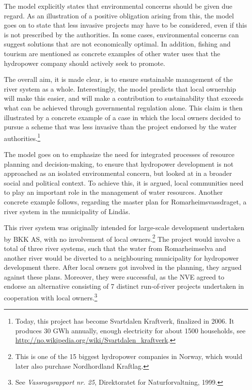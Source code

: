 The model explicitly states that environmental concerns should be given due regard. As an illustration of a positive obligation arising from this, the model goes on to state that less invasive projects may have to be considered, even if this is not prescribed by the authorities. In some cases, environmental concerns can suggest solutions that are not economically optimal. In addition, fishing and tourism are mentioned as concrete examples of other water uses that the hydropower company should actively seek to promote.

The overall aim, it is made clear, is to ensure sustainable management of the river system as a whole. Interestingly, the model predicts that local ownership will make this easier, and will make a contribution to sustainability that exceeds what can be achieved through governmental regulation alone. This claim is then illustrated by a concrete example of a case in which the local owners decided to pursue a scheme that was less invasive than the project endorsed by the water authorities.\footnote{Today, this project has become Svartdalen Kraftverk, finalized in 2006. It produces 30 GWh annually, enough electricity for about 1500 households, see \url{http://no.wikipedia.org/wiki/Svartdalen_kraftverk}.}

The model goes on to emphasize the need for integrated processes of resource planning and decision-making, to ensure that hydropower development is not approached as an isolated environmental concern, but looked at in a broader social and political context. To achieve this, it is argued, local communities need to play an important role in the management of water resources. Another concrete example follows, regarding the master plan for Romarheimsvassdraget, a river system in the municipality of Lindås. 

This river system was originally intended for large-scale development undertaken by BKK AS, with no involvement of local owners.\footnote{This is one of the 15 biggest hydropower companies in Norway, which would later also purchase Nordhordland Kraftlag.} The project would involve a total of three river systems, such that the water from Romarheimselva and another river would be diverted to a neighbouring municipality for hydropower development there. After local owners got involved in the planning, they argued against these plans. Moreover, they were successful, as the NVE agreed to endorse an alternative consisting of 7 distinct run-of-river projects undertaken in cooperation with local owners.\footnote{See {\it Vassragsrapport nr. 25}, Direktoratet for Naturforvaltning, 1999.}

